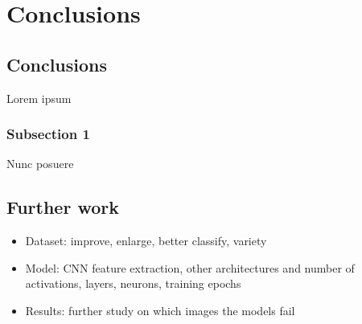 
\chapter{Conclusions}

\label{Chapter6}


\section{Conclusions}

Lorem ipsum

\subsection{Subsection 1}

Nunc posuere

\section{Further work}

\begin{itemize}
	\item Dataset: improve, enlarge, better classify, variety
	\item Model: CNN feature extraction, other architectures and number of activations, layers, neurons, training epochs
	\item Results: further study on which images the models fail
\end{itemize}